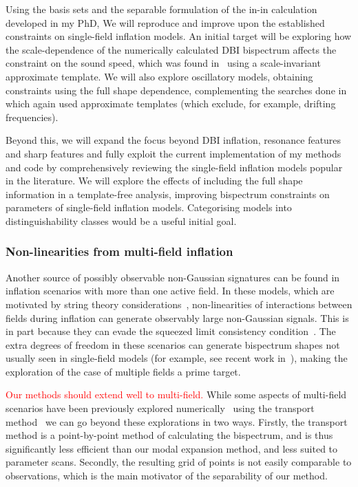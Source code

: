 Using the basis sets and the separable formulation of the in-in calculation developed in my PhD,
We will reproduce and improve upon the established constraints on single-field inflation models.
An initial target will be exploring how the scale-dependence of the numerically calculated DBI bispectrum
affects the constraint on the sound speed, which was found in~\cite{Planck_NG_2018}
using a scale-invariant approximate template. We will also explore oscillatory models,
obtaining constraints using the full shape dependence, complementing the
searches done in~\cite{Planck_NG_2018} which again used approximate templates
(which exclude, for example, drifting frequencies).

Beyond this,
we will expand the focus beyond DBI inflation, resonance features and sharp features
and fully exploit the current implementation of my methods and code
by comprehensively reviewing the single-field inflation models popular in the literature.
We will explore the effects of including the full shape information in a template-free analysis,
improving bispectrum constraints on parameters of single-field inflation models.
Categorising models into distinguishability classes would be a useful initial goal.



\subsubsection*{Non-linearities from multi-field inflation}
Another source of possibly observable non-Gaussian signatures can be
found in inflation scenarios with more than one active field.
In these models, which are motivated by string theory considerations~\cite{achucarro_multifield1},
non-linearities of interactions between fields during inflation
can generate observably large non-Gaussian signals.
This is in part because they can evade the squeezed limit consistency condition~\cite{sqz_consistency}.
The extra degrees of freedom in these scenarios can generate bispectrum shapes not usually
seen in single-field models (for example, see recent work in~\cite{RP_2, Fumagalli_2019}),
making the exploration of the case of multiple fields a prime target.


\textcolor{red}{Our methods should extend well to multi-field.}
While some aspects of multi-field scenarios have been previously explored
numerically~\cite{Fumagalli_2019} using the transport method~\cite{transport_pytransport_2}
we can go beyond these explorations in two ways. Firstly, the transport method is a
point-by-point method of calculating the bispectrum, and is thus significantly
less efficient than our modal expansion method, and less suited to parameter scans.
Secondly, the resulting grid of points is not easily comparable to observations,
which is the main motivator of the separability of our method.

